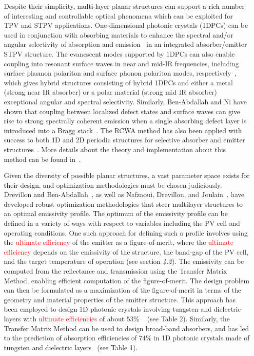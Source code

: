 \documentclass[review]{elsarticle}
\begin{document}
Despite their simplicity, multi-layer planar structures can support a rich number of interesting and controllable optical phenomena
which can be exploited for TPV and STPV applications.  One-dimensional photonic crystals (1DPCs) can be used in conjunction with absorbing
materials to enhance the spectral and/or angular selectivity of absorption and emission~\cite{paper1_ref4} in an integrated absorber/emitter STPV
structure.  The evanescent modes supported by 1DPCs
can also enable coupling into resonant surface waves in near and mid-IR frequencies, including surface plasmon polariton and surface
phonon polariton modes, respectively~\cite{LZ_JApplPhys_2006}, which gives hybrid 
structures consisting of hybrid 1DPCs and either a metal (strong near IR
absorber) or a polar material (strong mid IR absorber) 
exceptional angular and spectral selectivity.  Similarly, Ben-Abdallah and Ni have shown that coupling
between localized defect states and surface waves can give rise to strong spectrally coherent emission when a single absorbing defect layer is
introduced into a Bragg stack~\cite{BN_JApplPhys_2005}. The RCWA method has also been applied with success to both 1D and 2D periodic structures for selective absorber and emitter structures~\cite{A13, RCWA3}.  More details about the theory and implementation about this method can be found in~\cite{RCWA1, RCWA2}. 

Given the diversity of possible planar structures, a vast parameter space exists for their design, and optimization methodologies must
be chosen judiciously.  Drevillon and Ben-Abdallah~\cite{DB_JApplPhys_2007}, as well as Nafzaoui, Drevillon, and Joulain~\cite{NDJ_JApplPhys_2012},
have developed robust optimization 
methodologies that steer multilayer structures to an optimal emissivity profile. The optimum of the emissivity
profile can be defined in a variety of ways with respect to variables including the PV cell and operating conditions.
One such approach for defining such a profile involves using the \textcolor{red}{ultimate efficiency} of the emitter as a figure-of-merit,
where the \textcolor{red}{ultimate efficiency} depends on the emissivity of the structure, the band-gap of the PV cell, and the target 
temperature of operation (see section {\it 4.2}).  
The emissivity can be computed from the reflectance
and transmission using the Transfer Matrix Method, enabling efficient computation of the figure-of-merit.  The design problem can then be
formulated as a maximization of the figure-of-merit in terms of the geometry and material properties of the emitter structure.
This approach has been employed to design 1D photonic crystals involving tungsten and dielectric layers with \textcolor{red}{ultimate efficiencies} of 
about 53\% ~\cite{SKY_JPE_2015} (see Table 2).  Similarly, the Transfer 
Matrix Method can be used to design broad-band absorbers, 
and has led to the prediction of 
absorption efficiencies of 74\% in 1D photonic crystals made of tungsten 
and dielectric layers~\cite{SKY_JPE_2015} (see Table 1).
\end{document}
